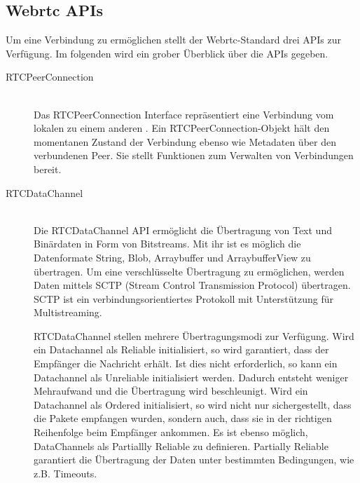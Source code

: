 \subsection{Webrtc APIs}
Um eine \pTp Verbindung zu ermöglichen stellt der Webrtc-Standard drei APIs zur Verfügung. Im folgenden wird ein grober Überblick über die APIs gegeben.
\begin{description}
\item[RTCPeerConnection]\hfill \\
Das RTCPeerConnection Interface repräsentiert eine Verbindung vom lokalen \client zu einem anderen \client. Ein RTCPeer\-Connection-Objekt hält den momentanen Zustand der Verbindung ebenso wie Metadaten über den verbundenen Peer. Sie stellt Funktionen zum Verwalten von Verbindungen bereit.



\item[RTCDataChannel]\hfill \\
Die RTCDataChannel API ermöglicht die Übertragung von Text und Binärdaten in Form von Bitstreams. Mit ihr ist es möglich die Datenformate String, Blob, Arraybuffer und ArraybufferView zu übertragen.\cite{rfc-datachannel} Um eine verschlüsselte Übertragung zu ermöglichen, werden Daten mittels SCTP (Stream Control Transmission Protocol) übertragen. SCTP ist ein verbindungsorientiertes Protokoll mit Unterstützung für Multistreaming.\cite{rfc-sctp} 

RTCDataChannel stellen mehrere Übertragungsmodi zur Verfügung. Wird ein Datachannel als Reliable initialisiert, so wird garantiert, dass der Empfänger die Nachricht erhält. Ist dies nicht erforderlich, so kann ein Datachannel als Unreliable initialisiert werden. Dadurch entsteht weniger Mehraufwand und die Übertragung wird beschleunigt. Wird ein Datachannel als Ordered initialisiert, so wird nicht nur sichergestellt, dass die Pakete empfangen wurden, sondern auch, dass sie in der richtigen Reihenfolge beim Empfänger ankommen. Es ist ebenso möglich, DataChannels als Partiallly Reliable zu definieren. Partially Reliable garantiert die Übertragung der Daten unter bestimmten Bedingungen, wie z.B. Timeouts.




\end{description}
